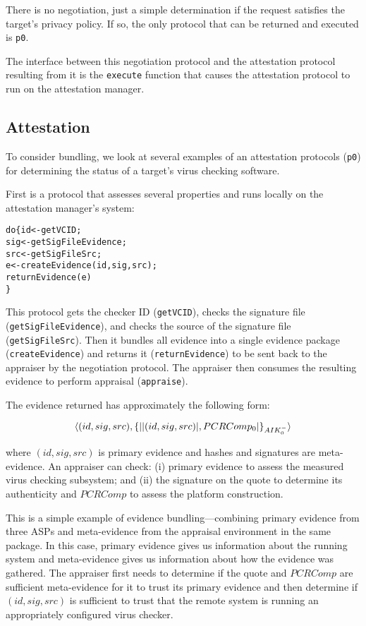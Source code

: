 \documentclass[10pt]{article}
\begin{document}
There is no negotiation, just a simple determination if the request
satisfies the target's privacy policy.  If so, the only protocol that
can be returned and executed is \Verb+p0+.

The interface between this negotiation protocol and the attestation
protocol resulting from it is the \Verb+execute+ function that causes
the attestation protocol to run on the attestation manager.

\subsection*{Attestation}

To consider bundling, we look at several examples of an attestation
protocols (\Verb+p0+) for determining the status of a target's virus
checking software.

First is a protocol that assesses several properties and runs locally
on the attestation manager's system:

\begin{alltt}
  do \{ id <- getVCID;
       sig <- getSigFileEvidence;
       src <- getSigFileSrc;
       e <- createEvidence(id,sig,src);
       returnEvidence(e)
  \}
\end{alltt}

This protocol gets the checker ID (\Verb+getVCID+), checks the
signature file (\Verb+getSigFileEvidence+), and checks the source of
the signature file (\Verb+getSigFileSrc+). Then it bundles all
evidence into a single evidence package (\Verb+createEvidence+) and
returns it (\Verb+returnEvidence+) to be sent back to the appraiser by
the negotiation protocol.  The appraiser then consumes the resulting
evidence to perform appraisal (\Verb+appraise+).

The evidence returned has approximately the following form:

\[\langle (id,sig,src),\{\lvert \lvert (id,sig,src) \rvert,PCRComp_0\rvert\}_{AIK_0^{-}}\rangle\]

where $(id,sig,src)$ is primary evidence and hashes and signatures are
meta-evidence.  An appraiser can check: (i) primary evidence to assess
the measured virus checking subsystem; and (ii) the signature on the
quote to determine its authenticity and $PCRComp$ to assess the
platform construction.

This is a simple example of evidence bundling---combining primary
evidence from three ASPs and meta-evidence from the appraisal
environment in the same package.  In this case, primary evidence gives
us information about the running system and meta-evidence gives us
information about how the evidence was gathered.  The appraiser first
needs to determine if the quote and $PCRComp$ are sufficient
meta-evidence for it to trust its primary evidence and then determine
if $(id,sig,src)$ is sufficient to trust that the remote system is
running an appropriately configured virus checker.
\end{document}
